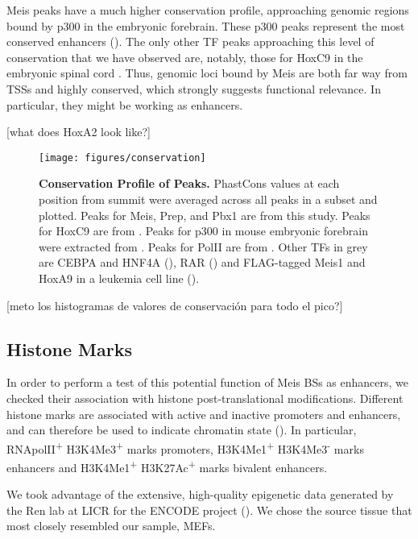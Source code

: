 Meis peaks have a much higher conservation profile, approaching genomic regions bound by p300 in the embryonic forebrain. These p300 peaks represent the most conserved enhancers (\cite{Blow2010}). The only other \ac{TF} peaks approaching this level of conservation that we have observed are, notably, those for HoxC9 in the embryonic spinal cord \cite{Jung2010}. Thus, genomic loci bound by Meis are both far way from \acp{TSS} and highly conserved, which strongly suggests functional relevance. In particular, they might be working as enhancers.

[what does HoxA2 look like?] 

\begin{figure}[]
  
  \centering
  \label{fig:conservation}
  \texttt{[image: figures/conservation]}
  \caption[Conservation Profile of Peaks]{\textbf{Conservation Profile of Peaks.} PhastCons values at each position from summit were averaged across all peaks in a subset and plotted. Peaks for Meis, Prep, and Pbx1 are from this study. Peaks for HoxC9 are from \cite{Jung2010}. Peaks for p300 in mouse embryonic forebrain were extracted from \cite{Blow2010}. Peaks for PolII are from \cite{Mahony2011}. Other TFs in grey are CEBPA and HNF4A (\cite{Schmidt2010}), RAR (\cite{Mahony2011}) and FLAG-tagged Meis1 and HoxA9 in a leukemia cell line (\cite{Huang2012}).}
\end{figure}


[meto los histogramas de valores de conservación para todo el pico?]

\subsection{Histone Marks}

In order to perform a test of this potential function of Meis \acp{BS} as enhancers, we checked their association with histone post-translational modifications. Different histone marks are associated with active and inactive promoters and enhancers, and can therefore be used to indicate chromatin state (\cite{Mikkelsen2007}). In particular, RNApolII\textsuperscript{+} H3K4Me3\textsuperscript{+} marks promoters,  H3K4Me1\textsuperscript{+} H3K4Me3\textsuperscript{-} marks enhancers and H3K4Me1\textsuperscript{+} H3K27Ac\textsuperscript{+} marks bivalent enhancers. 

We took advantage of the extensive, high-quality epigenetic data generated by the Ren lab at LICR for the ENCODE project (\cite{Shen2012}). We chose the source tissue that most closely resembled our sample, \acp{MEF}. 

